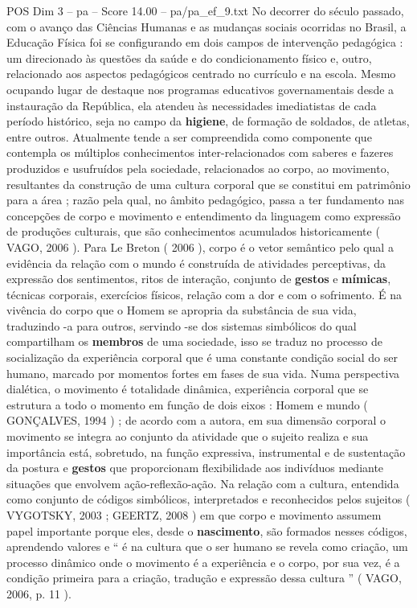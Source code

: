 \begin{textsample}{POS Dim 3 – pa – Score 14.00 – pa/pa\_ef\_9.txt}
No decorrer do século passado, com o avanço das Ciências Humanas e as mudanças sociais ocorridas no Brasil, a Educação Física foi se configurando em dois campos de intervenção pedagógica : um direcionado às questões da saúde e do condicionamento físico e, outro, relacionado aos aspectos pedagógicos centrado no currículo e na escola.
Mesmo ocupando lugar de destaque nos programas educativos governamentais desde a instauração da República, ela atendeu às necessidades imediatistas de cada período histórico, seja no campo da \textbf{higiene}, de formação de soldados, de atletas, entre outros.
Atualmente tende a ser compreendida como componente que contempla os múltiplos conhecimentos inter-relacionados com saberes e fazeres produzidos e usufruídos pela sociedade, relacionados ao corpo, ao movimento, resultantes da construção de uma cultura corporal que se constitui em patrimônio para a área ; razão pela qual, no âmbito pedagógico, passa a ter fundamento nas concepções de corpo e movimento e entendimento da linguagem como expressão de produções culturais, que são conhecimentos acumulados historicamente ( VAGO, 2006 ).
Para Le Breton ( 2006 ), corpo é o vetor semântico pelo qual a evidência da relação com o mundo é construída de atividades perceptivas, da expressão dos sentimentos, ritos de interação, conjunto de \textbf{gestos} e \textbf{mímicas}, técnicas corporais, exercícios físicos, relação com a dor e com o sofrimento.
É na vivência do corpo que o Homem se apropria da substância de sua vida, traduzindo -a para outros, servindo -se dos sistemas simbólicos do qual compartilham os \textbf{membros} de uma sociedade, isso se traduz no processo de socialização da experiência corporal que é uma constante condição social do ser humano, marcado por momentos fortes em fases de sua vida.
Numa perspectiva dialética, o movimento é totalidade dinâmica, experiência corporal que se estrutura a todo o momento em função de dois eixos : Homem e mundo ( GONÇALVES, 1994 ) ; de acordo com a autora, em sua dimensão corporal o movimento se integra ao conjunto da atividade que o sujeito realiza e sua importância está, sobretudo, na função expressiva, instrumental e de sustentação da postura e \textbf{gestos} que proporcionam flexibilidade aos indivíduos mediante situações que envolvem ação-reflexão-ação.
Na relação com a cultura, entendida como conjunto de códigos simbólicos, interpretados e reconhecidos pelos sujeitos ( VYGOTSKY, 2003 ; GEERTZ, 2008 ) em que corpo e movimento assumem papel importante porque eles, desde o \textbf{nascimento}, são formados nesses códigos, aprendendo valores e “ é na cultura que o ser humano se revela como criação, um processo dinâmico onde o movimento é a experiência e o corpo, por sua vez, é a condição primeira para a criação, tradução e expressão dessa cultura ” ( VAGO, 2006, p. 11 ).

\end{textsample}
